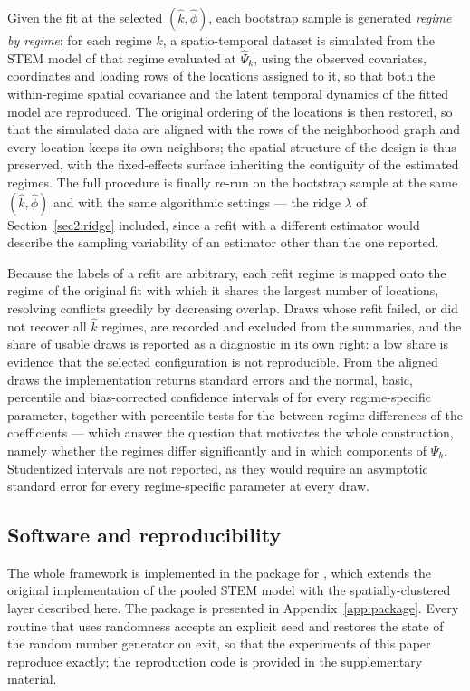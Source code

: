 Given the fit at the selected $(\hat{k}, \hat{\phi})$, each bootstrap sample is generated \emph{regime by regime}: for each regime $k$, a spatio-temporal dataset is simulated from the STEM model of that regime evaluated at $\hat{\Psi}_k$, using the observed covariates, coordinates and loading rows of the locations assigned to it, so that both the within-regime spatial covariance and the latent temporal dynamics of the fitted model are reproduced. The original ordering of the locations is then restored, so that the simulated data are aligned with the rows of the neighborhood graph and every location keeps its own neighbors; the spatial structure of the design is thus preserved, with the fixed-effects surface inheriting the contiguity of the estimated regimes. The full procedure is finally re-run on the bootstrap sample at the same $(\hat{k}, \hat{\phi})$ and with the same algorithmic settings --- the ridge $\lambda$ of Section~\ref{sec2:ridge} included, since a refit with a different estimator would describe the sampling variability of an estimator other than the one reported.

Because the labels of a refit are arbitrary, each refit regime is mapped onto the regime of the original fit with which it shares the largest number of locations, resolving conflicts greedily by decreasing overlap. Draws whose refit failed, or did not recover all $\hat{k}$ regimes, are recorded and excluded from the summaries, and the share of usable draws is reported as a diagnostic in its own right: a low share is evidence that the selected configuration is not reproducible. From the aligned draws the implementation returns standard errors and the normal, basic, percentile and bias-corrected confidence intervals of \citet{DavisonHinkley1997} for every regime-specific parameter, together with percentile tests for the between-regime differences of the coefficients --- which answer the question that motivates the whole construction, namely whether the regimes differ significantly and in which components of $\Psi_k$. Studentized intervals are not reported, as they would require an asymptotic standard error for every regime-specific parameter at every draw.

\subsection{Software and reproducibility}\label{sec:software}

The whole framework is implemented in the \Stem{} package for \Rlang{} \citep{StemPackage,RCore}, which extends the original implementation of the pooled STEM model with the spatially-clustered layer described here. The package is presented in Appendix~\ref{app:package}. Every routine that uses randomness accepts an explicit seed and restores the state of the random number generator on exit, so that the experiments of this paper reproduce exactly; the reproduction code is provided in the supplementary material.

